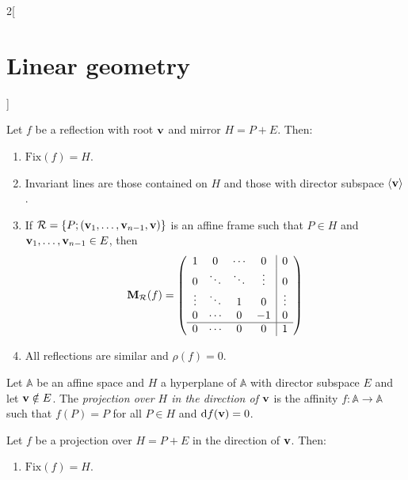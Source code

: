 \documentclass[../../../main.tex]{subfiles}
\begin{document}
\begin{multicols}{2}[\section{Linear geometry}]
\begin{definition}[Reflections]
    \end{definition}
    \begin{prop}
        Let $f$ be a reflection with root $\boldsymbol{\mathrm{v}}$ and mirror $H=P+E$. Then:
        \begin{enumerate}
            \item $\text{Fix}(f)=H$.
            \item Invariant lines are those contained on $H$ and those with director subspace $\langle\boldsymbol{\mathrm{v}}\rangle$.
            \item If $\mathcal{R}=\{P;(\boldsymbol{\mathrm{v}}_1,\ldots,\boldsymbol{\mathrm{v}}_{n-1},\boldsymbol{\mathrm{v}})\}$ is  an affine frame such that $P\in H$ and $\boldsymbol{\mathrm{v}}_1,\ldots,\boldsymbol{\mathrm{v}}_{n-1}\in E$, then $$\boldsymbol{\mathrm{M}}_\mathcal{R}(f)=\left(\begin{array}{cccc|c}
                              1      & 0      & \cdots & 0      & 0      \\
                              0      & \ddots & \ddots & \vdots & 0      \\
                              \vdots & \ddots & 1      & 0      & \vdots \\
                              0      & \cdots & 0      & -1     & 0      \\
                              \hline
                              0      & \cdots & 0      & 0      & 1      \\
                          \end{array}\right)$$
            \item All reflections are similar and $\rho(f)=0$.
        \end{enumerate}
    \end{prop}
    \begin{definition}[Projections]
        Let $\mathbb{A}$ be an affine space and $H$ a hyperplane of $\mathbb{A}$ with director subspace $E$ and let $\boldsymbol{\mathrm{v}}\notin E$. The \textit{projection over $H$ in the direction of $\boldsymbol{\mathrm{v}}$} is the affinity $f:\mathbb{A}\rightarrow\mathbb{A}$ such that $f(P)=P$ for all $P\in H$ and $\dd f(\boldsymbol{\mathrm{v}})=0$.
    \end{definition}
    \begin{prop}
        Let $f$ be a projection over $H=P+E$ in the direction of $\boldsymbol{\mathrm{v}}$. Then:
        \begin{enumerate}
            \item $\text{Fix}(f)=H$.

\end{enumerate}
\end{prop}
\end{multicols}
\end{document}
